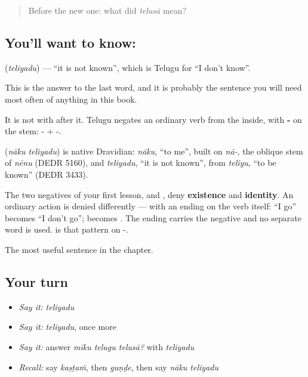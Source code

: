 \begin{quote}
Before the new one: what did \emph{telusā} mean?
\end{quote}

\subsection*{You'll want to know:  }
\textbf{} (\emph{teliyadu}) — \textquotedblleft{}it is not known\textquotedblright{}, which is Telugu for \textquotedblleft{}I don't know\textquotedblright{}.

This is the answer to the last word, and it is probably the sentence you will need most often of anything in this book.

It is not  with  after it. Telugu negates an ordinary verb from the inside, with \textbf{-} on the stem: - + -.

\begin{cousinweb}
\textbf{ } (\emph{nāku teliyadu}) is native Dravidian: \emph{nāku}, \textquotedblleft{}to me\textquotedblright{}, built on \emph{nā-}, the oblique stem of \emph{nēnu} (DEDR 5160), and \emph{teliyadu}, \textquotedblleft{}it is not known\textquotedblright{}, from \emph{teliyu}, \textquotedblleft{}to be known\textquotedblright{} (DEDR 3433).
\end{cousinweb}

\begin{grammarlens}[title={Grammar Lens: how Telugu says a verb did not happen}]
The two negatives of your first lesson,  and , deny \textbf{existence} and \textbf{identity}. An ordinary action is denied differently — with an ending on the verb itself:  \textquotedblleft{}I go\textquotedblright{} becomes \textbf{} \textquotedblleft{}I don't go\textquotedblright{};  becomes \textbf{}. The ending carries the negative and no separate word is used.  is that pattern on -.
\end{grammarlens}

\begin{grammarlens}[title={What you've built}]
The most useful sentence in the chapter.
\end{grammarlens}

\subsection*{Your turn}
\begin{itemize}
\raggedright
  \item \emph{Say it:} \emph{teliyadu}
  \item \emph{Say it:} \emph{teliyadu}, once more
  \item \emph{Say it:} answer \emph{mīku telugu telusā?} with \emph{teliyadu}
  \item \emph{Recall:} say \emph{kaṣṭaṁ}, then \emph{guṇḍe}, then say \emph{nāku teliyadu}
\end{itemize}

